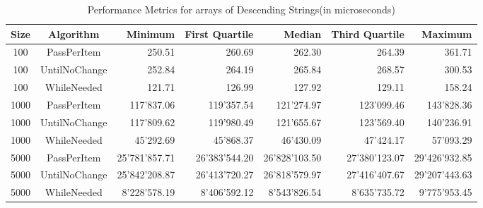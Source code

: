 \documentclass{article}
\begin{document}
\begin{table}[htbp]
    \centering
    \begin{tabular}{ccrrrrr}
        \toprule
        \textbf{Size} & \textbf{Algorithm} & \textbf{Minimum} & \textbf{First Quartile} & \textbf{Median} & \textbf{Third Quartile} & \textbf{Maximum} \\
        \midrule
        100 & PassPerItem & 250.51 & 260.69 & 262.30 & 264.39 & 361.71 \\
        100 & UntilNoChange & 252.84 & 264.19 & 265.84 & 268.57 & 300.53 \\
        100 & WhileNeeded & 121.71 & 126.99 & 127.92 & 129.11 & 158.24 \\
        1000 & PassPerItem & 117'837.06 & 119'357.54 & 121'274.97 & 123'099.46 & 143'828.36 \\
        1000 & UntilNoChange & 117'809.62 & 119'980.49 & 121'655.67 & 123'569.40 & 140'236.91 \\
        1000 & WhileNeeded & 45'292.69 & 45'868.37 & 46'430.09 & 47'424.17 & 57'093.29 \\
        5000 & PassPerItem & 25'781'857.71 & 26'383'544.20 & 26'828'103.50 & 27'380'123.07 & 29'426'932.85 \\
        5000 & UntilNoChange & 25'842'208.87 & 26'413'720.27 & 26'818'579.97 & 27'416'407.67 & 29'207'443.63 \\
        5000 & WhileNeeded & 8'228'578.19 & 8'406'592.12 & 8'543'826.54 & 8'635'735.72 & 9'775'953.45 \\
        \bottomrule
    \end{tabular}
    \caption{Performance Metrics for arrays of Descending Strings(in microseconds)}
    \label{tab:performance_4}
\end{table}
\end{document}
